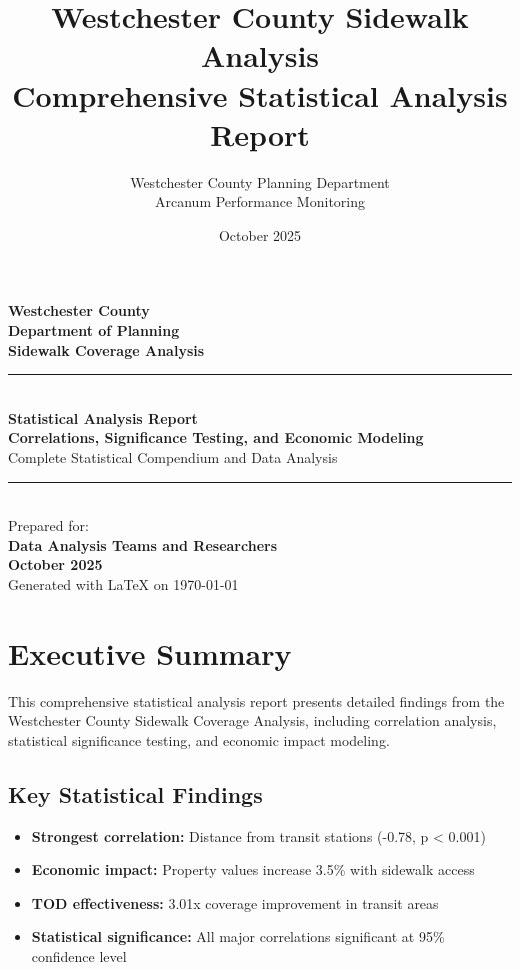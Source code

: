 \documentclass[11pt,letterpaper]{article}
\title{Westchester County Sidewalk Analysis\\
\large Comprehensive Statistical Analysis Report}
\author{Westchester County Planning Department\\
Arcanum Performance Monitoring}
\date{October 2025}
\begin{document}
\begin{titlepage}
    \centering
    \vspace*{2cm}

    {\Large\bfseries Westchester County}\\[0.5cm]
    {\large\bfseries Department of Planning}\\[0.5cm]
    {\large\bfseries Sidewalk Coverage Analysis}\\[1cm]

    \rule{\textwidth}{1.5pt}\\[0.5cm]
    {\huge\bfseries Statistical Analysis Report}\\[0.3cm]
    {\Large\bfseries Correlations, Significance Testing, and Economic Modeling}\\[0.3cm]
    {\large Complete Statistical Compendium and Data Analysis}\\[0.5cm]
    \rule{\textwidth}{1.5pt}\\[1cm]

    {\large Prepared for:}\\[0.3cm]
    {\large\bfseries Data Analysis Teams and Researchers}\\[1cm]

    {\large\bfseries October 2025}\\[1cm]

    \vfill
    {\small Generated with \LaTeX{} on \today}
\end{titlepage}

\tableofcontents
\newpage

\section{Executive Summary}

This comprehensive statistical analysis report presents detailed findings from the Westchester County Sidewalk Coverage Analysis, including correlation analysis, statistical significance testing, and economic impact modeling.

\subsection{Key Statistical Findings}

\begin{itemize}
    \item \textbf{Strongest correlation:} Distance from transit stations (-0.78, p < 0.001)
    \item \textbf{Economic impact:} Property values increase 3.5\% with sidewalk access
    \item \textbf{TOD effectiveness:} 3.01x coverage improvement in transit areas
    \item \textbf{Statistical significance:} All major correlations significant at 95\% confidence level
\end{itemize}
\end{document}
